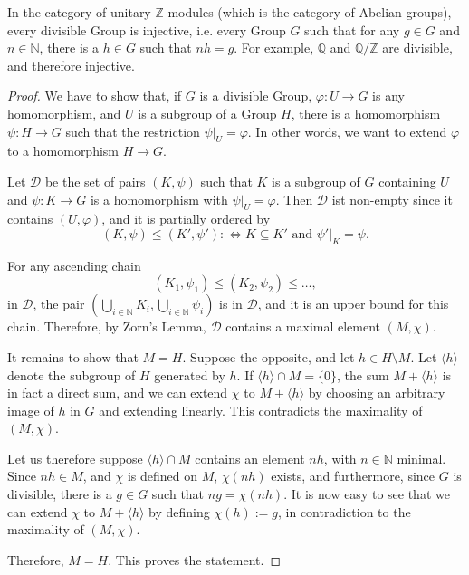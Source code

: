 \documentclass[12pt]{article}
\begin{document}
In the category of unitary $\mathbb{Z}$-modules (which is the category of Abelian groups), every divisible Group is injective, i.e. every Group $G$ such that for any $g \in G$ and $n \in \mathbb{N}$, there is a $h \in G$ such that $nh = g$. For example, $\mathbb{Q}$ and $\mathbb{Q}/\mathbb{Z}$ are divisible, and therefore injective.

\begin{proof}
We have to show that, if $G$ is a divisible Group, $\varphi: U \to G$ is any homomorphism, and $U$ is a subgroup of a Group $H$, there is a homomorphism $\psi: H \to G$ such that the restriction $\psi|_U = \varphi$. In other words, we want to extend $\varphi$ to a homomorphism $H \to G$.

Let $\mathcal{D}$ be the set of pairs $(K, \psi)$ such that $K$ is a subgroup of $G$ containing $U$ and $\psi: K \to G$ is a homomorphism with $\psi|_U = \varphi$. Then $\mathcal{D}$ ist non-empty since it contains $(U, \varphi)$, and it is partially ordered by
\[ (K, \psi) \leq (K', \psi') :\Longleftrightarrow K \subseteq K' \text{ and } \psi'|_K = \psi. \]

For any ascending chain
\[ (K_1, \psi_1) \leq (K_2, \psi_2) \leq \dots, \]
in $\mathcal{D}$, the pair $(\bigcup_{i \in \mathbb{N}} K_i, \bigcup_{i \in \mathbb{N}} \psi_i)$ is in $\mathcal{D}$, and it is an upper bound for this chain. Therefore, by Zorn's Lemma, $\mathcal{D}$ contains a maximal element $(M, \chi)$.

It remains to show that $M = H$. Suppose the opposite, and let $h \in H \setminus M$. Let $\langle h \rangle$ denote the subgroup of $H$ generated by $h$. If $\langle h \rangle \cap M = \{0\}$, the sum $M + \langle h \rangle$ is in fact a direct sum, and we can extend $\chi$ to $M + \langle h \rangle$ by choosing an arbitrary image of $h$ in $G$ and extending linearly. This contradicts the maximality of $(M, \chi)$.

Let us therefore suppose $\langle h \rangle \cap M$ contains an element $nh$, with $n \in \mathbb{N}$ minimal. Since $nh \in M$, and $\chi$ is defined on $M$, $\chi(nh)$ exists, and furthermore, since $G$ is divisible, there is a $g \in G$ such that $ng = \chi(nh)$. It is now easy to see that we can extend $\chi$ to $M + \langle h \rangle$ by defining $\chi(h) := g$, in contradiction to the maximality of $(M, \chi)$.

Therefore, $M = H$. This proves the statement.
\end{proof}
\end{document}
